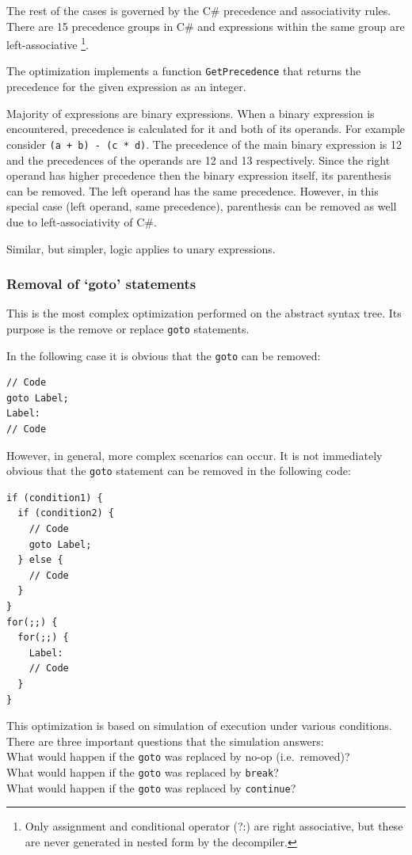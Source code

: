 \documentclass[12pt,twoside,notitlepage]{report}
\begin{document}
The rest of the cases is governed by the C\# precedence
and associativity rules.  There are 15 precedence groups in
C\# and expressions within the same group are left-associative%
\footnote{Only assignment and conditional operator (?:)
are right associative, but these are never generated in nested
form by the decompiler.}.

The optimization implements a function \verb|GetPrecedence| that
returns the precedence for the given expression as an integer.

Majority of expressions are binary expressions.  When a binary
expression is encountered, precedence is calculated for it
and both of its operands.
For example consider \verb|(a + b) - (c * d)|. 
The precedence of the main binary expression is 12 and the 
precedences of the operands are 12 and 13 respectively.
Since the right operand has higher precedence then the binary 
expression itself, its parenthesis can be removed.
The left operand has the same precedence.  However, in this special 
case (left operand, same precedence), parenthesis can be removed
as well due to left-associativity of C\#.

Similar, but simpler, logic applies to unary expressions.

\subsubsection{Removal of `goto' statements}
        \label{Removal of `goto' statements}

This is the most complex optimization performed on the
abstract syntax tree.  Its purpose is the remove or replace
\verb|goto| statements.

In the following case it is obvious that the \verb|goto| can be removed:
\begin{verbatim}
// Code
goto Label;
Label:
// Code
\end{verbatim}

However, in general, more complex scenarios can occur.
It is not immediately obvious that the \verb|goto| statement
can be removed in the following code:

\begin{verbatim}
if (condition1) {
  if (condition2) {
    // Code
    goto Label;
  } else {
    // Code
  }
}
for(;;) {
  for(;;) {
    Label:
    // Code
  }
}
\end{verbatim}

This optimization is based on simulation of execution under
various conditions.
There are three important questions that the simulation answers: \\
What would happen if the \verb|goto| was replaced by no-op (i.e.\ removed)? \\
What would happen if the \verb|goto| was replaced by \verb|break|? \\
What would happen if the \verb|goto| was replaced by \verb|continue|?
\end{document}
